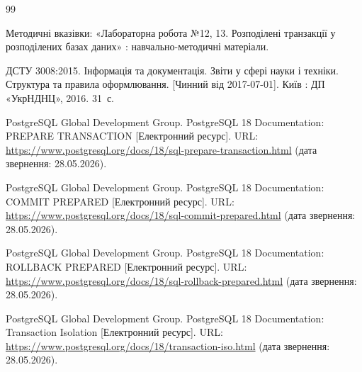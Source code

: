 \clearpage
{}
{}
\begin{thebibliography}{99}

Методичні вказівки: «Лабораторна робота №12, 13. Розподілені транзакції у розподілених базах даних» : навчально-методичні матеріали.

ДСТУ 3008:2015. Інформація та документація. Звіти у сфері науки і техніки. Структура та правила оформлювання. [Чинний від 2017-07-01]. Київ : ДП «УкрНДНЦ», 2016. 31~с.

PostgreSQL Global Development Group. PostgreSQL 18 Documentation: PREPARE TRANSACTION [Електронний ресурс]. URL: \url{https://www.postgresql.org/docs/18/sql-prepare-transaction.html} (дата звернення: 28.05.2026).

PostgreSQL Global Development Group. PostgreSQL 18 Documentation: COMMIT PREPARED [Електронний ресурс]. URL: \url{https://www.postgresql.org/docs/18/sql-commit-prepared.html} (дата звернення: 28.05.2026).

PostgreSQL Global Development Group. PostgreSQL 18 Documentation: ROLLBACK PREPARED [Електронний ресурс]. URL: \url{https://www.postgresql.org/docs/18/sql-rollback-prepared.html} (дата звернення: 28.05.2026).

PostgreSQL Global Development Group. PostgreSQL 18 Documentation: Transaction Isolation [Електронний ресурс]. URL: \url{https://www.postgresql.org/docs/18/transaction-iso.html} (дата звернення: 28.05.2026).

\end{thebibliography}
